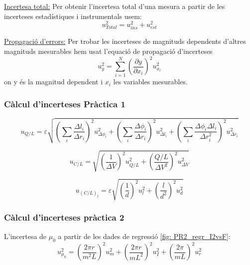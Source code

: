 \documentclass[11pt]{article}
\numberwithin{equation}{section}
\numberwithin{figure}{section}
\numberwithin{table}{section}
\begin{document}
\underline{Incertesa total:} Per obtenir l'incertesa total d'una mesura a partir de les incerteses estadístiques i instrumentals usem:
\begin{equation} \label{eq: incertesa total}
    u_{Total}^2 = u_{ins}^2+u_{est}^2
\end{equation}

\underline{Propagació d'errors:}  Per trobar les incerteses de magnituds dependents d'altres magnituds mesurables hem usat l'equació de propagació d'incerteses
\begin{equation} \label{eq: propagació d'errors}
    u_{y}^2=\sum_{i=1}^{N}(\frac{\partial y}{\partial x_i})^2u_{x_i}^2
\end{equation}
on y és la magnitud dependent i ${x_i}$ les variables mesurables.

\subsubsection{Càlcul d'incerteses Pràctica 1}
\begin{equation}
    u_{Q/L} = \varepsilon \sqrt{
        \left( \sum_i \frac{\Delta l_i}{\Delta r_i} \right)^2 u^2_{\Delta \phi_i} +
        \left( \sum_i \frac{\Delta \phi_i}{\Delta r_i} \right)^2 u^2_{\Delta l_i} +
        \left( \sum_i \frac{\Delta \phi_i \Delta l_i}{\Delta r_i^2} \right)^2 u^2_{\Delta r_i}}
        \label{eq: ins_q}
\end{equation}


\begin{equation}
    u_{C/L} = \sqrt{
        \left( \frac{1}{\Delta V} \right)^2 u^2_{Q/L} +
        \left( \frac{Q/L}{\Delta V^2} \right)^2 u^2_{\Delta V}}
    \label{eq: ins_c}
\end{equation}

\begin{equation}
    u_{(C/L)_t} = \varepsilon \sqrt{
    \left( \frac{1}{d} \right)^2 u^2_l +
    \left( \frac{l}{d^2} \right)^2 u^2_d}
    \label{eq: ins_ct}
\end{equation}

\subsubsection{Càlcul d'incerteses pràctica 2}\label{sec: PR2_calcul_incerteses}

L'incertesa de $\mu_0$ a partir de les dades de regressió \ref{fig: PR2_regr_I2vsF}:
\begin{equation}
    u_{\mu_0}^2 = \left(\frac{2\pi r}{m^2L}\right)^2u_m^2 + \left(\frac{2\pi r}{mL^2}\right)^2u_I^2 + \left(\frac{2\pi}{mL}\right)^2u_r^2
\end{equation}
\end{document}
